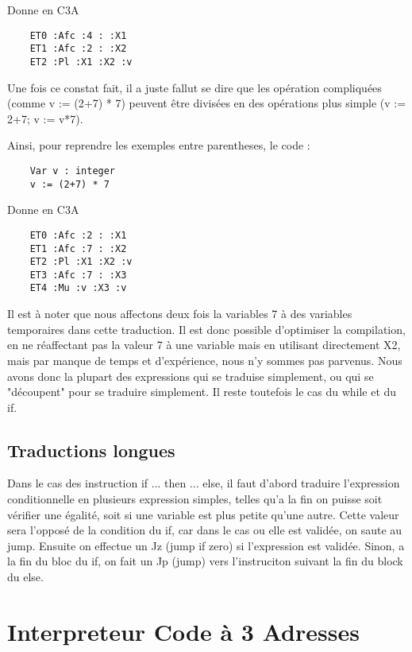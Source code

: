 \documentclass{article}
\begin{document}
Donne en C3A

\begin{lstlisting}
    ET0 :Afc :4 : :X1
    ET1 :Afc :2 : :X2
    ET2 :Pl :X1 :X2 :v
\end{lstlisting}

\bigbreak

Une fois ce constat fait, il a juste fallut se dire que les opération compliquées (comme v := (2+7) * 7) peuvent être divisées en des opérations plus simple (v := 2+7; v := v*7).

Ainsi, pour reprendre les exemples entre parentheses, le code :

\begin{lstlisting}
    Var v : integer
    v := (2+7) * 7
\end{lstlisting}

Donne en C3A

\begin{lstlisting}
    ET0 :Afc :2 : :X1
    ET1 :Afc :7 : :X2
    ET2 :Pl :X1 :X2 :v
    ET3 :Afc :7 : :X3
    ET4 :Mu :v :X3 :v
\end{lstlisting}

Il est à noter que nous affectons deux fois la variables 7 à des variables temporaires dans cette traduction. Il est donc possible d'optimiser la compilation, en ne réaffectant pas la valeur 7 à une variable mais en utilisant directement X2, mais par manque de temps et d'expérience, nous n'y sommes pas parvenus.
\bigbreak
Nous avons donc la plupart des expressions qui se traduise simplement, ou qui se "découpent" pour se traduire simplement. Il reste toutefois le cas du while et du if.


\subsection{Traductions longues}

Dans le cas des instruction if ... then ... else, il faut d'abord traduire l'expression conditionnelle en plusieurs expression simples, telles qu'a la fin on puisse soit vérifier une égalité, soit si une variable est plus petite qu'une autre.
Cette valeur sera l'opposé de la condition du if, car dans le cas ou elle est validée, on saute au jump. Ensuite on effectue un Jz (jump if zero) si l'expression est validée.
Sinon, a la fin du bloc du if, on fait un Jp (jump) vers l'instruciton suivant la fin du block du else.
\newpage
\section{Interpreteur Code à 3 Adresses}
\end{document}
